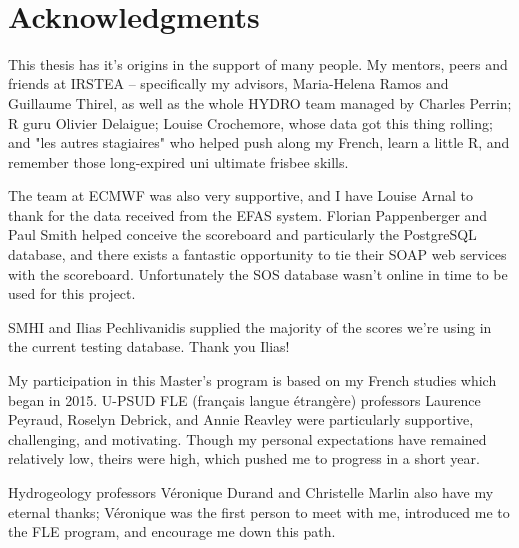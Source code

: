 \documentclass[logos,parttoc,morelanguage=french,morelanguage=german]{orsay-memoire}
\begin{document}
\noindent\hspace*{0.35\textwidth}\hrulefill\hspace*{0.35\textwidth}\\[-\bigskipamount]




\section*{Acknowledgments}
\vfill
This thesis has it's origins in the support of many people. My mentors, peers and friends at IRSTEA -- specifically my advisors, Maria-Helena Ramos and Guillaume Thirel, as well as the whole HYDRO team managed by Charles Perrin; R guru Olivier Delaigue; Louise Crochemore, whose data got this thing rolling; and "les autres stagiaires" who helped push along my French, learn a little R, and remember those long-expired uni ultimate frisbee skills.

The team at ECMWF was also very supportive, and I have Louise Arnal to thank for the data received from the EFAS system. Florian Pappenberger and Paul Smith helped conceive the scoreboard and particularly the PostgreSQL database, and there exists a fantastic opportunity to tie their SOAP web services with the scoreboard. Unfortunately the SOS database wasn't online in time to be used for this project.

SMHI and Ilias Pechlivanidis supplied the majority of the scores we're using in the current testing database. Thank you Ilias!

My participation in this Master's program is based on my French studies which began in 2015. U-PSUD FLE (français langue étrangère) professors Laurence Peyraud, Roselyn Debrick, and Annie Reavley were particularly supportive, challenging, and motivating. Though my personal expectations have remained relatively low, theirs were high, which pushed me to progress in a short year.

Hydrogeology professors Véronique Durand and Christelle Marlin also have my eternal thanks; Véronique was the first person to meet with me, introduced me to the FLE program, and encourage me down this path.
\end{document}
